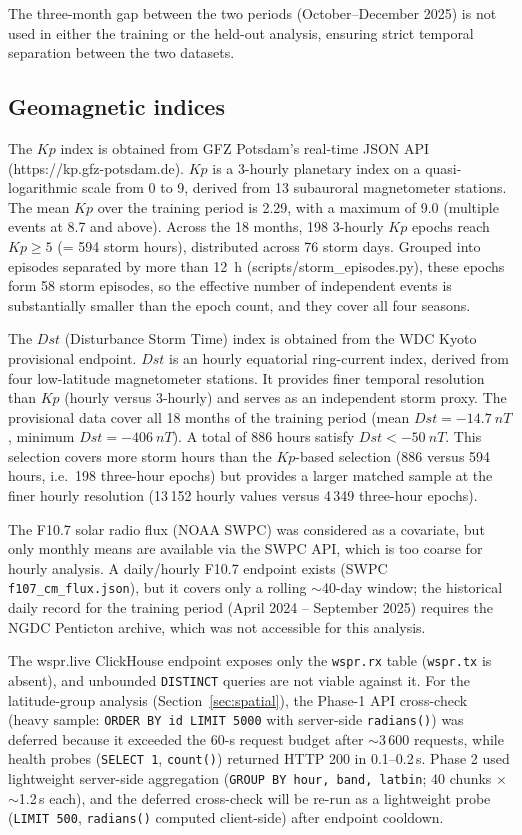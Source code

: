 \documentclass{agujournal2019}
\begin{document}
The three-month gap between the two periods (October--December 2025) is not
used in either the training or the held-out analysis, ensuring strict temporal
separation between the two datasets.

\subsection{Geomagnetic indices}

The $Kp$ index is obtained from GFZ Potsdam's real-time JSON API
(https://kp.gfz-potsdam.de). $Kp$ is a 3-hourly planetary index on a
quasi-logarithmic scale from 0 to 9, derived from 13 subauroral magnetometer
stations. The mean $Kp$ over the training period is 2.29, with a maximum
of 9.0 (multiple events at 8.7 and above). Across the 18 months, 198 3-hourly $Kp$
epochs reach $Kp \ge 5$ (= 594 storm hours), distributed across 76
storm days. Grouped into episodes separated by more than 12~h
(scripts/storm\_episodes.py), these epochs form 58 storm episodes, so
the effective number of independent events is substantially smaller
than the epoch count, and they cover all four seasons.

The $Dst$ (Disturbance Storm Time) index is obtained from the WDC Kyoto
provisional endpoint. $Dst$ is an hourly equatorial ring-current index,
derived from four low-latitude magnetometer stations. It provides finer
temporal resolution than $Kp$ (hourly versus 3-hourly) and serves as an
independent storm proxy. The provisional data cover all 18 months of the
training period (mean $Dst = \SI{-14.7}{nT}$, minimum
$Dst = \SI{-406}{nT}$). A total of 886 hours satisfy $Dst < \SI{-50}{nT}$.
This selection covers more storm hours than the $Kp$-based selection
(886 versus 594 hours, i.e.\ 198 three-hour epochs) but provides a
larger matched sample at the finer hourly resolution (13\,152 hourly
values versus 4\,349 three-hour epochs).

The F10.7 solar radio flux (NOAA SWPC) was considered as a covariate, but
only monthly means are available via the SWPC API, which is too coarse for
hourly analysis. A daily/hourly F10.7 endpoint exists (SWPC \texttt{f107\_cm\_flux.json}), but it covers only a rolling $\sim$40-day window; the historical daily record for the training period (April 2024 -- September 2025) requires the NGDC Penticton archive, which was not accessible for this analysis.


The wspr.live ClickHouse endpoint exposes only the \texttt{wspr.rx}
table (\texttt{wspr.tx} is absent), and unbounded \texttt{DISTINCT}
queries are not viable against it. For the latitude-group analysis
(Section~\ref{sec:spatial}), the Phase-1 API cross-check (heavy sample:
\texttt{ORDER BY id LIMIT 5000} with server-side \texttt{radians()})
was deferred because it exceeded the 60-s request budget after
$\sim$3\,600 requests, while health probes (\texttt{SELECT 1},
\texttt{count()}) returned HTTP 200 in 0.1--0.2\,s. Phase 2 used
lightweight server-side aggregation (\texttt{GROUP BY hour, band,
latbin}; 40 chunks $\times$ $\sim$1.2\,s each), and the deferred
cross-check will be re-run as a lightweight probe (\texttt{LIMIT 500},
\texttt{radians()} computed client-side) after endpoint cooldown.
\end{document}
